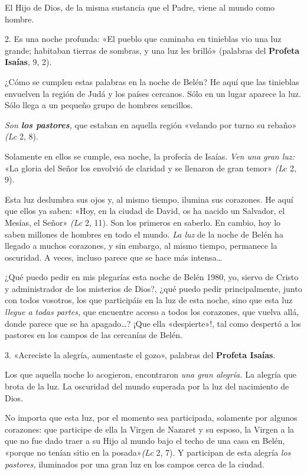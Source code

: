 \documentclass[]{article}
\begin{document}
El Hijo de Dios, de la misma sustancia que el Padre, viene al mundo como
hombre.

2. Es una noche profunda: «El pueblo que caminaba en tinieblas vio una
luz grande; habitaban tierras de sombras, y una luz les brilló»
(palabras del \textbf{Profeta Isaías}, 9, 2).

¿Cómo se cumplen estas palabras en la noche de Belén? He aquí que las
tinieblas envuelven la región de Judá y los países cercanos. Sólo en un
lugar aparece la luz. Sólo llega a un pequeño grupo de hombres
sencillos.

\emph{Son \textbf{los pastores},} que estaban en aquella región «velando
por turno su rebaño» \emph{(Lc} 2, 8).

Solamente en ellos se cumple, esa noche, la profecía de Isaías.
\emph{Ven una gran luz:} «La gloria del Señor los envolvió de claridad y
se llenaron de gran temor» \emph{(L}c 2, 9).

Esta luz deslumbra sus ojos y, al mismo tiempo, ilumina sus corazones.
He aquí que ellos ya saben: «Hoy, en la ciudad de David, os ha nacido un
Salvador, el Mesías, el Señor» \emph{(Lc} 2, 11). Son los primeros en
saberlo. En cambio, hoy lo saben millones de hombres en todo el mundo.
\emph{La luz} de la noche de Belén ha llegado a muchos corazones, y sin
embargo, al mismo tiempo, permanece la oscuridad. A veces, incluso
parece que se hace más intensa\ldots{}

¿Qué puedo pedir en mis plegarías esta noche de Belén 1980, yo, siervo
de Cristo y administrador de los misterios de Dios?, ¿qué puedo pedir
principalmente, junto con todos vosotros, los que participáis en la luz
de esta noche, sino que esta luz \emph{llegue a todas partes,} que
encuentre acceso a todos los corazones, que vuelva allá, donde parece
que se ha apagado\ldots{}? ¡Que ella «despierte»!, tal como despertó a
los pastores en los campos de las cercanías de Belén.

3. «Acreciste la alegría, aumentaste el gozo», palabras del
\textbf{Profeta Isaías}.

Los que aquella noche lo acogieron, encontraron \emph{una gran alegría.}
La alegría que brota de la luz. La oscuridad del mundo superada por la
luz del nacimiento de Dios.

No importa que esta luz, por el momento sea participada, solamente por
algunos corazones: que participe de ella la Virgen de Nazaret y su
esposo, la Virgen a la que no fue dado traer a su Hijo al mundo bajo el
techo de una casa en Belén, «porque no tenían sitio en la
posada»\emph{(Lc} 2, 7). Y participan de esta alegría \emph{los
pastores,} iluminados por una gran luz en los campos cerca de la ciudad.
\end{document}
